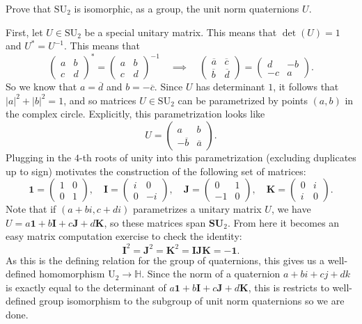 \documentclass{pset}
\begin{document}
\begin{problem}{2.5}
  Prove that $\textrm{SU}_2$ is isomorphic, as a group, the unit norm quaternions $U$.
\end{problem}

\begin{solution}
  First, let $U\in \textrm{SU}_2$ be a special unitary matrix. This means that $\det(U)=1$ and $U^* = U^{-1}$. This means that
  \[
    \begin{pmatrix}
      a&b\\ c&d
    \end{pmatrix}^* = 
    \begin{pmatrix}
      a&b\\ c&d
      \end{pmatrix}^{-1} \quad\implies\quad \begin{pmatrix}\overline{a}&\overline{c}\\ \overline{b}&\overline{d}\end{pmatrix} = \begin{pmatrix}d&-b\\ -c&a\end{pmatrix}.
  \]
  So we know that $a=\overline{d}$ and $b = -\overline{c}$. Since $U$ has determinant $1$, it follows that $|a|^2+|b|^2=1$, and so matrices $U\in \mathrm{SU}_2$ can be parametrized by points $(a,b)$ in the complex circle. Explicitly, this parametrization looks like 
  \[
    U = \begin{pmatrix}a&b\\ -\overline{b}&\overline{a}\end{pmatrix}.
  \]
  Plugging in the $4$-th roots of unity into this parametrization (excluding duplicates up to sign) motivates the construction of the following set of matrices:
  \[
    \mathbf{1} = \begin{pmatrix}1&0\\0&1\end{pmatrix},\quad \mathbf{I}=\begin{pmatrix}i&0\\0&-i\end{pmatrix},\quad \mathbf{J}=\begin{pmatrix}0&1\\-1&0\end{pmatrix},\quad \mathbf{K} = \begin{pmatrix}0&i\\i&0\end{pmatrix}.
  \]
  Note that if $(a+bi, c+di)$ parametrizes a unitary matrix $U$, we have $U = a\mathbf{1}+b\mathbf{I}+c\mathbf{J}+d\mathbf{K}$, so these matrices span $\textbf{SU}_2$. From here it becomes an easy matrix computation exercise to check the identity:
  \[
    \mathbf{I}^2=\mathbf{J}^2=\mathbf{K}^2=\mathbf{I}\mathbf{J}\mathbf{K}=-\mathbf{1}.
  \]
  As this is the defining relation for the group of quaternions, this gives us a well-defined homomorphism $\textrm{U}_2 \to \mathbb{H}$. Since the norm of a quaternion $a+bi+cj+dk$ is exactly equal to the determinant of $a\mathbf{1} + b\mathbf{I} + c\mathbf{J}+d\mathbf{K}$, this is restricts to well-defined group isomorphism to the subgroup of unit norm quaternions so we are done.
\end{solution}
\end{document}
